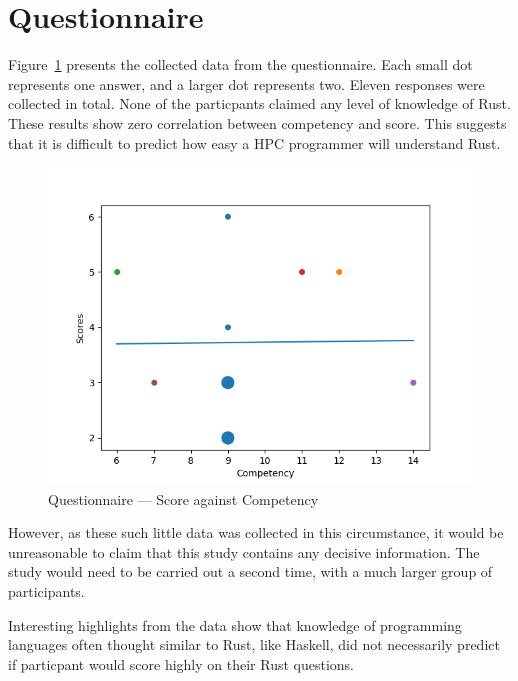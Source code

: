 \section{Questionnaire}
Figure~\ref{fig:questions} presents the collected data from the questionnaire. Each small dot represents one answer, and a larger dot represents two. Eleven responses were collected in total. None of the particpants claimed any level of knowledge of Rust.
These results show zero correlation between competency and score. This suggests that it is difficult to predict how easy a HPC programmer will understand Rust. 

\begin{figure}[h]
\centering
\includegraphics[width=.8\linewidth]{figs/questions/scatter.png}
\caption{Questionnaire --- Score against Competency}\label{fig:questions}
\end{figure}

However, as these such little data was collected in this circumstance, it would be unreasonable to claim that this study contains any decisive information. The study would need to be carried out a second time, with a much larger group of participants.

Interesting highlights from the data  show that knowledge of programming languages often thought similar to Rust, like Haskell, did not necessarily predict if  particpant would score highly on their Rust questions.
